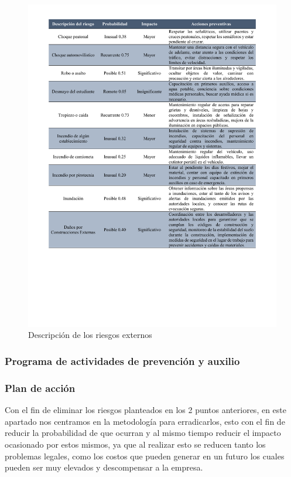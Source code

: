     \begin{figure}[H] 
        \centering
        \includegraphics[trim = {15mm 60mm 15mm 10mm},clip,scale=0.41]{22/Img/riesgosExternos.pdf}
        \caption{Descripción de los riesgos externos}
        \label{fig:ideEx}
    \end{figure}
    
    
    \subsubsection{Programa de actividades de prevención y auxilio}
    
    
    \subsubsection{Plan de acción}
    
    Con el fin de eliminar los riesgos planteados en los 2 puntos anteriores, en este apartado nos centramos en la metodología para erradicarlos, esto con el fin de reducir la probabilidad de que ocurran y al mismo tiempo reducir el impacto ocasionado por estos mismos, ya que al realizar esto se reducen tanto los problemas legales, como los costos que pueden generar en un futuro los cuales pueden ser muy elevados y descompensar a la empresa.
    
